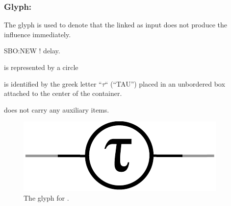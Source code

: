 \color{red}
\subsubsection{Glyph: }\label{sec:delay}

The glyph  is used to denote that the  linked as input does not produce the influence immediately.

\begin{glyphDescription}

 \glyphSboTerm SBO:NEW ! delay.

 \glyphContainer {} is represented by a circle

  \glyphLabel {} is identified by the greek letter ``$\tau$`` (``TAU'') placed in an unbordered box attached to the center of the container. 

  \glyphAux {} does not carry any auxiliary items.

\end{glyphDescription}

\begin{figure}[H]
  \centering
  \includegraphics[scale = 0.5]{images/delay}
  \caption{The \ER glyph for .}
  \label{fig:delay}
\end{figure}
\normalcolor
